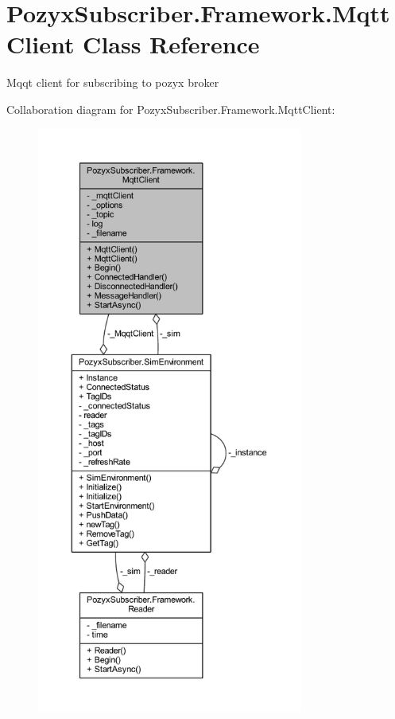\hypertarget{class_pozyx_subscriber_1_1_framework_1_1_mqtt_client}{}\section{Pozyx\+Subscriber.\+Framework.\+Mqtt\+Client Class Reference}
\label{class_pozyx_subscriber_1_1_framework_1_1_mqtt_client}


Mqqt client for subscribing to pozyx broker  




Collaboration diagram for Pozyx\+Subscriber.\+Framework.\+Mqtt\+Client\+:
\nopagebreak
\begin{figure}[H]
\begin{center}
\leavevmode
\includegraphics[height=550pt]{class_pozyx_subscriber_1_1_framework_1_1_mqtt_client__coll__graph}
\end{center}
\end{figure}
